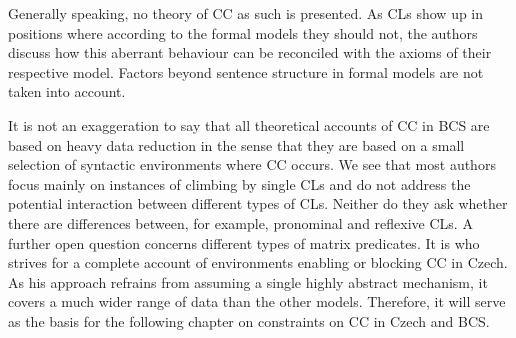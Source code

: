 Generally speaking, no theory of CC as such is presented. As CLs show up in positions where according to the formal models they should not, the authors discuss how this aberrant behaviour can be reconciled with the axioms of their respective model. Factors beyond sentence structure in formal models are not taken into account.

It is not an exaggeration to say that all theoretical accounts of CC in BCS are based on heavy data reduction in the sense that they are based on a small selection of syntactic environments where CC occurs. We see that most authors focus mainly on instances of climbing by single CLs and do not address the potential interaction between different types of CLs. Neither do they ask whether there are differences between, for example, pronominal and reflexive CLs. A further open question concerns different types of matrix predicates. It is \citet{Junghanns02} who strives for a complete account of environments enabling or blocking CC in Czech. As his approach refrains from assuming a single highly abstract mechanism, it covers a much wider range of data than the other models. Therefore, it will serve as the basis for the following chapter on constraints on CC in Czech and BCS. 
